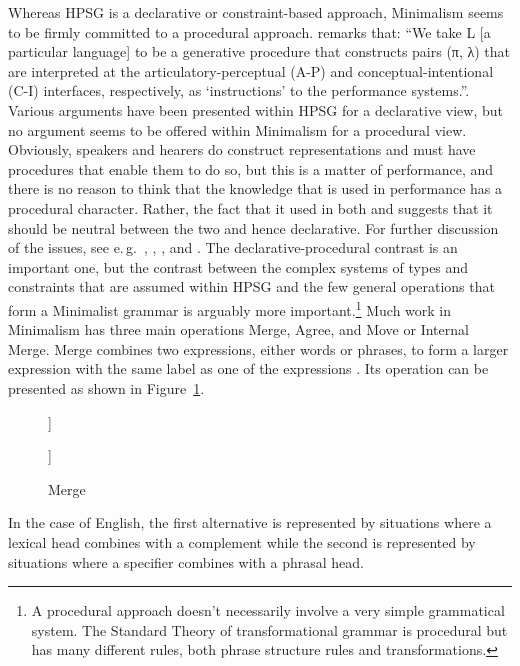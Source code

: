 \documentclass[output=paper]{langsci/langscibook}
\begin{document}
Whereas HPSG is a declarative or constraint-based approach, Minimalism seems to be firmly committed
to a procedural approach. \citet[219]{Chomsky95a-u} remarks that: ``We take L [a particular language]
to be a generative procedure that constructs pairs (π, λ) that are interpreted at the
articulatory-perceptual (A-P) and conceptual-intentional (C-I) interfaces, respectively, as
`instructions' to the performance systems.''. Various arguments have been presented within HPSG for
a declarative view, but no argument seems to be offered within Minimalism for a procedural
view. Obviously, speakers and hearers do construct representations and must have procedures that
enable them to do so, but this is a matter of performance, and there is no reason to think that the
knowledge that is used in performance has a procedural character. Rather, the fact that it used in
both  and  suggests that it should be neutral between the two and hence
declarative. For further discussion of the issues, see e.\,g.\ \citet{PS2001a}, \citet{Postal2003a},
\citeauthor{SW2011a} \citeyearpar{SW2011a,SW2015a}, and .
The declarative-procedural contrast is an important one, but the contrast between the complex
systems of types and constraints that are assumed within HPSG and the few general operations that
form a Minimalist grammar is arguably more important.\footnote{%
  A procedural approach doesn't necessarily involve a very simple grammatical system. The Standard
  Theory of transformational grammar \citep{Chomsky65a} is procedural but has many different rules,
  both phrase structure rules and transformations.}
Much work in Minimalism has three main operations Merge, Agree, and Move or Internal Merge. Merge
combines two expressions, either words or phrases, to form a larger expression with the same label
as one of the expressions \citep[244]{Chomsky95a-u}. Its operation can be presented as shown in Figure~\ref{fig:min-merge}.
\begin{figure}
\centering
	\raisebox{1\baselineskip}{X, Y $\Rightarrow$}
	\hspace{1em}
	\begin{forest}
		[X [X] [Y]]
	\end{forest}
\hspace{1em}
\raisebox{1\baselineskip}{or}
\hspace{1em}
	\begin{forest}
		[Y [X] [Y]]
	\end{forest}
	\caption{\label{fig:min-merge}Merge}
\end{figure}
In the case of English, the first alternative is represented by situations where a lexical head
combines with a complement while the second is represented by situations where a specifier combines
with a phrasal head. 
\end{document}
